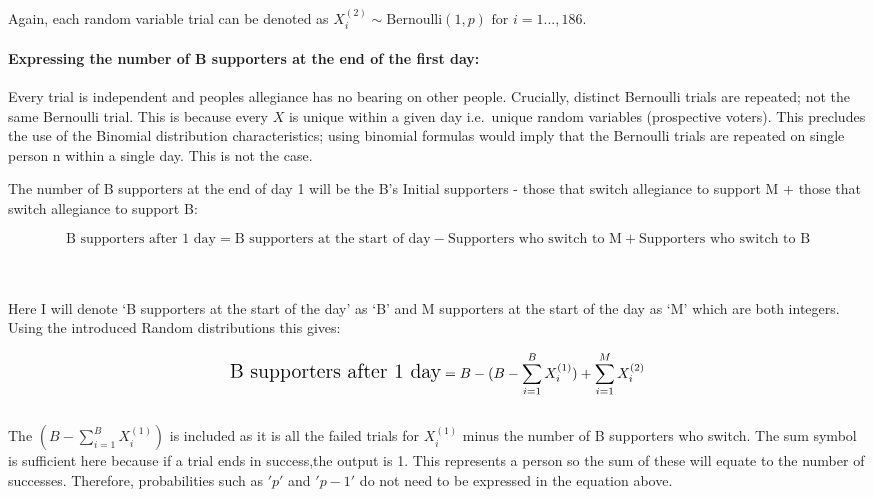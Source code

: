\documentclass[
]{article}
\begin{document}
Again, each random variable trial can be denoted as
\(X_i^{(2)} \sim \text{Bernoulli}(1,p) \text{ for } i = 1...,186\).\\

\hfill\break
\hfill\break

\paragraph{Expressing the number of B supporters at the end of the first
day:}\label{expressing-the-number-of-b-supporters-at-the-end-of-the-first-day}

Every trial is independent and peoples allegiance has no bearing on
other people. Crucially, distinct Bernoulli trials are repeated; not the
same Bernoulli trial. This is because every \(X\) is unique within a
given day i.e.~unique random variables (prospective voters). This
precludes the use of the Binomial distribution characteristics; using
binomial formulas would imply that the Bernoulli trials are repeated on
single person n within a single day. This is not the case.

The number of B supporters at the end of day 1 will be the B's Initial
supporters - those that switch allegiance to support M + those that
switch allegiance to support B:

\[
\text{B supporters after 1 day} =\text{B  supporters at the start of day} - \text{Supporters who switch to M} + \text{Supporters who switch to B}
\]\\
\strut \\

Here I will denote `B supporters at the start of the day' as `B' and M
supporters at the start of the day as `M' which are both integers. Using
the introduced Random distributions this gives:

\[
\Large
\text{B supporters after 1 day} = B -  (B-\sum_{i=1}^{B} X_i^{(1)}) +  \sum_{i=1}^{M}X_i^{(2)}
\]\\

The \((B-\sum_{i=1}^{B} X_i^{(1)})\) is included as it is all the failed
trials for \(X_i^{(1)}\) minus the number of B supporters who switch.
The sum symbol is sufficient here because if a trial ends in success,the
output is 1. This represents a person so the sum of these will equate to
the number of successes. Therefore, probabilities such as \('p'\) and
\('p-1'\) do not need to be expressed in the equation above.\\
\strut \\
\strut \\
\end{document}
